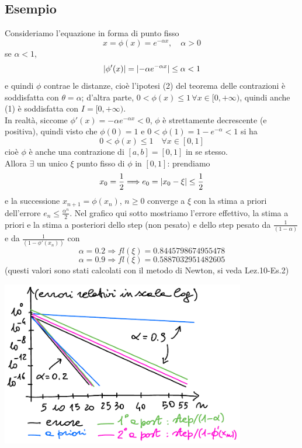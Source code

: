 \subsection{Esempio}
Consideriamo l'equazione in forma di punto fisso
\[x = \phi(x) = e^{-\alpha x}, \quad \alpha>0\]
se \uline{$\alpha<1$}, 
\[\lvert\phi'(x)\rvert = \lvert-\alpha e^{-\alpha x}\rvert \le \alpha < 1\]
e quindi $\phi$ contrae le distanze, cioè l'ipotesi (2) del teorema delle contrazioni è soddisfatta con $\theta = \alpha$; d'altra parte, $0<\phi(x) \le 1\, \forall x \in [0,+\infty)$, quindi anche (1) è soddisfatta con $I = [0,+\infty)$.\\
In realtà, siccome $\phi'(x)=-\alpha e^{-\alpha x}<0$, $\phi$ è strettamente decrescente (e positiva), quindi visto che $\phi(0)=1$ e $0<\phi(1)=1-e^{-\alpha}<1$ si ha
\[0 < \phi(x) \le 1 \quad \forall x \in [0,1]\]
cioè $\phi$ è anche una contrazione di $[a,b] = [0,1]$ in se stesso.\\
Allora $\exists$ un unico $\xi$ punto fisso di $\phi$ in $[0,1]$: prendiamo 
\[x_0 = \frac{1}{2} \Longrightarrow e_0 = \lvert x_0 - \xi\rvert \le \frac{1}{2}\]
e la successione $x_{n+1}=\phi(x_n)$, $n \ge 0$ converge a $\xi$ con la stima a priori dell'errore $e_n \le \frac{\alpha^n}{2}$.
\newline \newline
Nel grafico qui sotto mostriamo l'errore effettivo, la stima a priori e la stima a posteriori dello step (non pesato) e dello step pesato da $\frac{1}{(1-\alpha)}$ e da $\frac{1}{(1-\phi'(x_n))}$ con
\[\alpha = 0.2 \Longrightarrow fl(\xi) = 0.8445798674955478\]
\[\alpha = 0.9 \Longrightarrow fl(\xi) = 0.5887032951482605\]
(questi valori sono stati calcolati con il metodo di Newton, si veda Lez.10-Es.2)
\begin{center}
    \includegraphics[width=0.8\textwidth]{foto/pag16}
\end{center}
